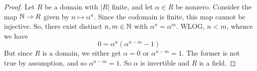 \begin{proof}
	Let $R$ be a domain with $|R|$ finite, and let $\alpha \in R$ be nonzero. Consider the map $\mathbb{N} \to R$ given by $n \mapsto \alpha^n$. Since the codomain is finite, this map cannot be injective. So, there exist distinct $n,m \in \mathbb{N}$ with $\alpha^n = \alpha^m$. WLOG, $n < m$, whence we have
	\[ 0 = \alpha^n(\alpha^{n-m}-1) \]
	But since $R$ is a domain, we either get $\alpha = 0$ or $\alpha^{n-m}=1$. The former is not true by assumption, and so $\alpha^{n-m}=1$. So $\alpha$ is invertible and $R$ is a field.
\end{proof}
